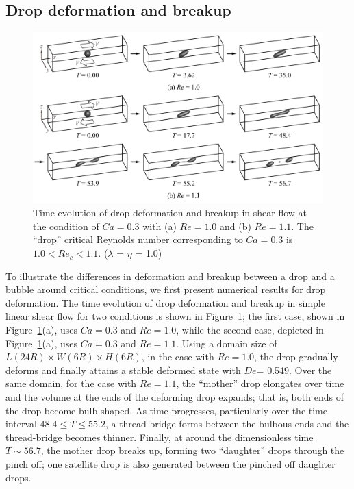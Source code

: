 \documentclass[%
 reprint,
 showkeys,
 amsmath,amssymb,
 aps,
 prfluids,
 onecolumn
]{revtex4-2}
\newcommand{\lwh}[3]{L(#1R)\times W(#2R) \times H(#3R)}
\begin{document}
\subsection{Drop deformation and breakup}\label{sec:DropBreak}
% 
\begin{figure}%
  \centering
  \includegraphics[width=\textwidth]{DropBreakEvol}
  \caption{Time evolution of drop deformation and breakup in shear flow at the
           condition of $Ca=0.3$ with (a) $Re=1.0$ and (b) $Re=1.1$.  The
	   ``drop'' critical Reynolds number corresponding to $Ca=0.3$ is
	   $1.0<Re_{c}<1.1$.
	   ($\lambda$ = $\eta$ = 1.0)}
  \label{fig:DropBreak}
\end{figure}
%
To illustrate the differences in deformation and breakup between a drop and a
bubble around critical conditions, we first present numerical results for drop
deformation.  The time evolution of drop deformation and breakup in simple
linear shear flow for two conditions is shown in Figure~\ref{fig:DropBreak};
the first case, shown in Figure~\ref{fig:DropBreak}(a), uses $Ca=0.3$ and
$Re=1.0$, while the second case, depicted in Figure~\ref{fig:DropBreak}(a),
uses $Ca=0.3$ and $Re=1.1$.  Using a domain size of $\lwh{24}{6}{6}$, in the
case with $Re=1.0$, the drop gradually deforms and finally attains a stable
deformed state with $De$= 0.549.  Over the same domain, for the case with
$Re=1.1$, the ``mother'' drop elongates over time and the volume at the ends of
the deforming drop expands; that is, both ends of the drop become bulb-shaped.
As time progresses, particularly over the time interval $48.4 \leq T \leq
55.2$, a thread-bridge forms between the bulbous ends and the thread-bridge
becomes thinner.  Finally, at around the dimensionless time $T\sim 56.7$, the
mother drop breaks up, forming two ``daughter'' drops through the pinch off;
one satellite drop is also generated between the pinched off daughter drops.
\end{document}
